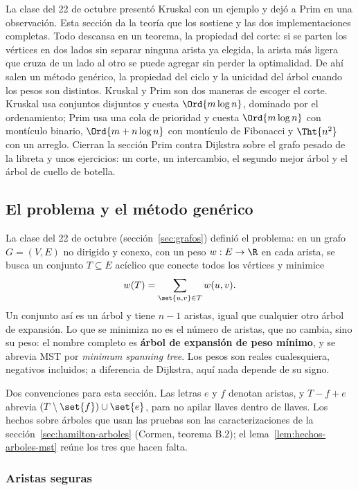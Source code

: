 \documentclass[11pt,letterpaper]{article}
\begin{document}
\begin{quick_sum}
  La clase del 22 de octubre presentó Kruskal con un ejemplo y dejó a
  Prim en una observación. Esta sección da la teoría que los sostiene
  y las dos implementaciones completas. Todo descansa en un teorema,
  la propiedad del corte: si se parten los vértices en dos lados sin
  separar ninguna arista ya elegida, la arista más ligera que cruza de
  un lado al otro se puede agregar sin perder la optimalidad. De ahí
  salen un método genérico, la propiedad del ciclo y la unicidad del
  árbol cuando los pesos son distintos. Kruskal y Prim son dos maneras
  de escoger el corte. Kruskal usa conjuntos disjuntos y cuesta
  $\Ord{m \log n}$, dominado por el ordenamiento; Prim usa una cola de
  prioridad y cuesta $\Ord{m \log n}$ con montículo binario,
  $\Ord{m + n \log n}$ con montículo de Fibonacci y $\Tht{n^2}$ con un
  arreglo. Cierran la sección Prim contra Dijkstra sobre el grafo
  pesado de la libreta y unos ejercicios: un corte, un intercambio, el
  segundo mejor árbol y el árbol de cuello de botella.
\end{quick_sum}

\subsection*{El problema y el método genérico}

La clase del 22 de octubre (sección~\ref{sec:grafos}) definió el
problema: en un grafo $G = (V, E)$ no dirigido y conexo, con un peso
$w : E \to \R$ en cada arista, se busca un conjunto $T \subseteq E$
acíclico que conecte todos los vértices y minimice
\[
  w(T) = \sum_{\set{u, v} \in T} w(u, v) .
\]
Un conjunto así es un árbol y tiene $n - 1$ aristas, igual que
cualquier otro árbol de expansión. Lo que se minimiza no es el número
de aristas, que no cambia, sino su peso: el nombre completo es
\textbf{árbol de expansión de peso mínimo}, y se abrevia MST por
\textit{minimum spanning tree}. Los pesos son reales cualesquiera,
negativos incluidos; a diferencia de Dijkstra, aquí nada depende de su
signo.

Dos convenciones para esta sección. Las letras $e$ y $f$ denotan
aristas, y $T - f + e$ abrevia $(T \setminus \set{f}) \cup \set{e}$,
para no apilar llaves dentro de llaves. Los hechos sobre árboles que
usan las pruebas son las caracterizaciones de la
sección~\ref{sec:hamilton-arboles} (Cormen, teorema B.2); el
lema~\ref{lem:hechos-arboles-mst} reúne los tres que hacen falta.

\subsubsection*{Aristas seguras}
\end{document}

